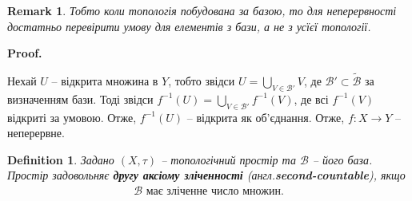 \documentclass[a4paper, 10pt]{article}
\makeatletter
\theoremstyle{theoremdd}
\newtheorem{definition}[theorem]{Definition}
\newtheorem{remark}[theorem]{Remark}
\renewenvironment{proof}[1][Proof.\\]{\par
\pushQED{\hfill \qed}%
\normalfont \topsep6\p@\@plus6\p@\relax
\trivlist
\item\relax
{\bfseries
#1\@addpunct{.}}\hspace\labelsep\ignorespaces
}{%
\popQED\endtrivlist\@endpefalse
}
\makeatother
\begin{document}
\begin{remark}
Тобто коли топологія побудована за базою, то для неперервності достатньо перевірити умову для елементів з бази, а не з усїєї топології.
\end{remark}

\begin{proof}
Нехай $U$ -- відкрита множина в $Y$, тобто звідси $U = \displaystyle\bigcup_{V \in \mathcal{B}'} V$, де $\mathcal{B}' \subset \tilde{\mathcal{B}}$ за визначенням бази. Тоді звідси $f^{-1}(U) = \displaystyle\bigcup_{V \in \mathcal{B}'} f^{-1}(V)$, де всі $f^{-1}(V)$ відкриті за умовою. Отже, $f^{-1}(U)$ -- відкрита як об'єднання. Отже, $f \colon X \to Y$ -- неперервне.
\end{proof}

\begin{definition}
Задано $(X,\tau)$ -- топологічний простір та $\mathcal{B}$ -- його база.\\
Простір задовольняє \textbf{другу аксіому зліченності} (англ.\@ \textbf{second-countable}), якщо
\begin{align*}
\mathcal{B} \text{ має зліченне число множин.}
\end{align*}
\end{definition}
\end{document}
